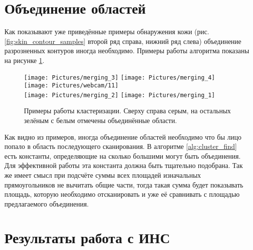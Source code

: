 \documentclass[12pt]{report}
\begin{document}
\section{Объединение областей}
Как показывают уже приведённые примеры обнаружения кожи (рис. \ref{fig:skin_contour_samples} второй ряд справа, 
нижний ряд слева) объединение разрозненных контуров иногда необходимо. Примеры работы алгоритма показаны на рисунке 
\ref{fig:merging_examples}.

\begin{figure}[h]
	\centering	
	\texttt{[image: Pictures/merging\_3]}\hspace{0.2cm}
	\texttt{[image: Pictures/merging\_4]}\hspace{0.2cm}
	\texttt{[image: Pictures/webcam/11]}\hspace{0.2cm}
	\\[0.5cm]
	\texttt{[image: Pictures/merging\_2]}\hspace{0.2cm}
	\texttt{[image: Pictures/merging\_1]}\hspace{0.2cm}
	
	\caption{Примеры работы кластеризации. Сверху справа серым, на остальных зелёным с белым отмечены объединённые 
области.}
	\label{fig:merging_examples}
\end{figure}

Как видно из примеров, иногда объединение областей необходимо что бы лицо попало в область последующего 
сканирования.   
В алгоритме \ref{alg:cluster_find} есть константы, определяющие на сколько большими могут быть объединения. Для эффективной работы эта 
константа должна быть тщательно подобрана. Так же имеет смысл при подсчёте суммы всех площадей изначальных 
прямоугольников не вычитать общие части, тогда такая сумма будет показывать площадь, которую необходимо 
отсканировать и уже её сравнивать с площадью предлагаемого объединения.

\section{Результаты работа с ИНС}

\end{document}
